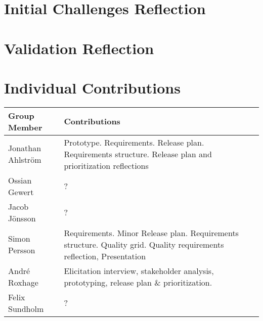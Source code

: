 \documentclass[a4paper]{article}
\begin{document}
\section{Initial Challenges Reflection}


\section{Validation Reflection}


\section*{Individual Contributions}

\begin{tabular}{|l|p{10cm}|}
    \hline
    \textbf{Group Member} & \textbf{Contributions} \\
    \hline
    Jonathan Ahlström & Prototype. Requirements. Release plan. Requirements structure. Release plan and prioritization reflections \\
    \hline
    Ossian Gewert & ? \\
    \hline
    Jacob Jönsson & ? \\
    \hline
    Simon Persson & Requirements. Minor Release plan. Requirements structure. Quality grid. Quality requirements reflection, Presentation \\
    \hline
    André Roxhage & Elicitation interview, stakeholder analysis, prototyping, release plan \& prioritization.  \\
    \hline
    Felix Sundholm & ? \\
    \hline
\end{tabular}
\end{document}
